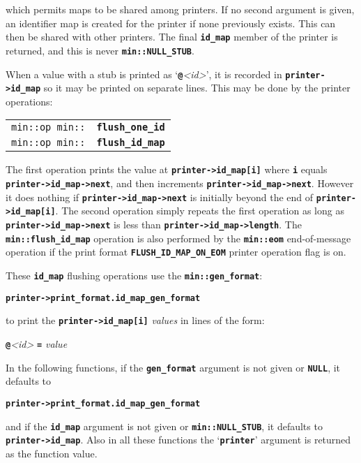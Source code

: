 \documentclass[12pt]{article}
\makeatletter
\newcommand{\TT}[1]{{\tt \bfseries #1}}
\newcommand{\ttindex}[1]{\index{#1@{\tt #1}}}
\newcommand{\EOL}{\penalty \exhyphenpenalty}
\newenvironment{indpar}[1][0.3in]%
	{\begin{list}{}%
		     {\setlength{\itemsep}{0in}%
		      \setlength{\topsep}{0in}%
		      \setlength{\parsep}{1ex}%
		      \setlength{\labelwidth}{#1}%
		      \setlength{\leftmargin}{#1}%
		      \addtolength{\leftmargin}{\labelsep}}%
	 \item}%
	{\end{list}}
\newcommand{\LABEL}[1]{\label{#1}}
\newcommand{\MINKEY}[1]%
	   {\TT{#1}\ttindex{min::#1}\ttindex{#1}}
\makeatother
\begin{document}
which permits maps to be shared among printers.  If no second argument
is given, an identifier map is created for the printer if none previously
exists.  This can then be shared with other printers.  The final
\TT{id\_\EOL map} member of the printer is returned, and this
is never \TT{min::\EOL NULL\_\EOL STUB}.

When a value with a stub is printed as
`\TT{@}{\em <id>}', it is recorded in \TT{printer->\EOL id\_\EOL map}
so it may be printed on separate lines.  This may be done by
the printer operations:

\begin{indpar}[1em]\begin{tabular}{r@{}l}
\verb|min::op min::| & \MINKEY{flush\_\EOL one\_\EOL id}
\LABEL{MIN::FLUSH_ONE_ID} \\
\verb|min::op min::| & \MINKEY{flush\_\EOL id\_\EOL map}
\LABEL{MIN::FLUSH_ID_MAP} \\
\end{tabular}\end{indpar}

The first operation prints the value at \TT{printer->\EOL id\_\EOL map[i]}
where \TT{i} equals \TT{printer->\EOL id\_\EOL map->\EOL next}, and then
increments \TT{printer->\EOL id\_\EOL map->\EOL next}.
However it does nothing if 
\TT{printer->\EOL id\_\EOL map->\EOL next} is initially beyond the
end of \TT{printer->\EOL id\_\EOL map[i]}.
The second operation
simply repeats the first operation as long as
\TT{printer->\EOL id\_\EOL map->\EOL next}
is less than \TT{printer->\EOL id\_\EOL map->\EOL length}.
The \TT{min::\EOL flush\_\EOL id\_\EOL map} operation is also
performed by the \TT{min::\EOL eom} end-of-message operation
if the print format
\TT{FLUSH\_\EOL ID\_\EOL MAP\_\EOL ON\_\EOL EOM} printer operation flag is on.

These \TT{id\_map} flushing operations use the \TT{min::gen\_\EOL format}:
\begin{center}
\TT{printer->\EOL print\_\EOL format.id\_\EOL map\_\EOL gen\_\EOL format}
\end{center}
to print the \TT{printer->id\_map[i]} {\em values} in lines of the form:
\begin{center}
\TT{@}{\em <id>} \TT{=} {\em value}
\end{center}

In the following functions,
if the \TT{gen\_format} argument is not given or \TT{NULL},
it defaults to
\begin{center}
\TT{printer->\EOL print\_\EOL format.id\_\EOL map\_\EOL gen\_\EOL format}
\end{center}
and if the \TT{id\_map} argument is not given or \TT{min::\EOL NULL\_\EOL STUB},
it defaults to \TT{printer->\EOL id\_\EOL map}.
Also in all these functions the `\TT{printer}' argument is returned as the
function value.
\end{document}
